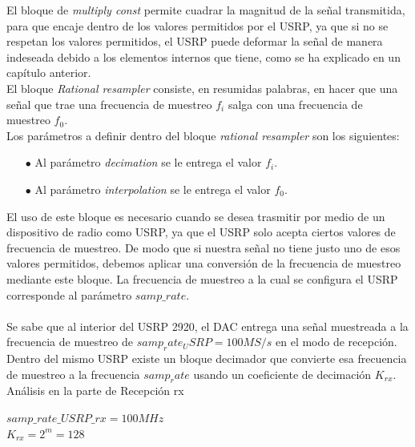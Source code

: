 \begin{itemize}
El bloque de \textit{multiply const} permite cuadrar la magnitud de la señal transmitida, para que encaje dentro de los valores permitidos por el USRP, ya que si no se respetan los valores permitidos, el USRP puede deformar la señal de manera indeseada debido a los elementos internos que tiene, como se ha explicado en un capítulo anterior.\\ 

El bloque \textit{Rational resampler} consiste, en resumidas palabras, en hacer que una señal que trae una frecuencia de muestreo $f_i$ salga con una frecuencia de muestreo $f_0$.\\
Los parámetros a definir dentro del bloque \textit{rational resampler} son los siguientes:\\

\begin{itemize}
\item [$\bullet$] Al parámetro \textit{decimation} se le entrega el valor $f_i$.\\
\item [$\bullet$] Al parámetro \textit{interpolation} se le entrega el valor $f_0$.\\
\end{itemize}

El uso de este bloque es necesario cuando se desea trasmitir por medio de un dispositivo de radio como USRP, ya que el USRP solo acepta ciertos valores de frecuencia de muestreo. De modo que si nuestra señal no tiene justo uno de esos valores permitidos, debemos aplicar una conversión de la frecuencia de muestreo mediante este bloque. La frecuencia de muestreo a la cual se configura el USRP corresponde al parámetro $samp\_rate$.\\
\ \\ %
Se sabe que al interior del USRP 2920, el DAC entrega una señal muestreada a la frecuencia de muestreo de $samp_rate_USRP=100 MS/s$ en el modo de recepción. Dentro del mismo USRP existe un bloque decimador que convierte esa frecuencia de muestreo a la frecuencia $samp_rate$ usando un coeficiente de decimación $K_{rx}$.\\


Análisis en la parte de Recepción rx\\

\begin{center}
$samp\_rate\_USRP\_rx= 100MHz$\\

$K_{rx}= 2^{m}=128$\\


\end{center}
\end{itemize}
